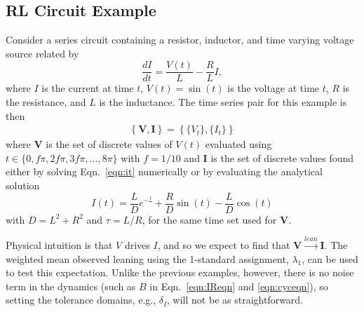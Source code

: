 \documentclass[twocolumn,aps,pre,groupedaddress]{revtex4-1}
\begin{document}
\subsection{RL Circuit Example}
\label{sec:rlcirc}
Consider a series circuit containing a resistor, inductor, and time varying voltage source related by
\begin{equation}
\label{eqn:it}
\frac{dI}{dt} = \frac{V(t)}{L} - \frac{R}{L} I,
\end{equation}
where $I$ is the current at time $t$, $V(t)= \sin\left(t\right)$ is the voltage at time $t$, $R$ is the resistance, and $L$ is the inductance.  The time series pair for this example is then 
\begin{eqnarray}
\label{eqn:RLcirceqn}
\left\{\mathbf{V},\mathbf{I}\right\} = \left\{\{V_t\},\{I_t\}\right\}
\end{eqnarray}
where $\mathbf{V}$ is the set of discrete values of $V(t)$ evaluated using $t\in\{0,f\pi,2f\pi,3f\pi,\ldots,8\pi\}$ with $f=1/10$ and $\mathbf{I}$ is the set of discrete values found either by solving Eqn.\ \ref{eqn:it} numerically or by evaluating the analytical solution 
\begin{equation}
I(t) = \frac{L}{D}e^{-\frac{t}{
}}+\frac{R}{D}\sin(t)-\frac{L}{D}\cos(t)
\end{equation}
with $D = L^2 + R^2$ and $\tau = L/R$, for the same time set used for $\mathbf{V}$.

Physical intuition is that $V$ drives $I$, and so we expect to find that $\mathbf{V}\xrightarrow{lean}\mathbf{I}$.  The weighted mean observed leaning using the 1-standard assignment, $\lambda_1$, can be used to test this expectation.  Unlike the previous examples, however, there is no noise term in the dynamics (such as $B$ in Eqn.\ \ref{eqn:IReqn} and \ref{eqn:cyceqn}), so setting the tolerance domains, e.g., $\delta_I$, will not be as straightforward.  
\end{document}

